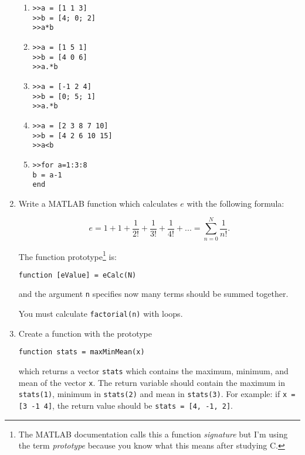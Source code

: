 \documentclass{lab}
\begin{document}
\begin{enumerate}
\begin{enumerate}
\item \texttt{>>a = [1 1 3]}\\
\texttt{>>b = [4; 0; 2]}\\
\texttt{>>a*b}

\item \texttt{>>a = [1 5 1]}\\
\texttt{>>b = [4 0 6]}\\
\texttt{>>a.*b}

\item \texttt{>>a = [-1 2 4]}\\
\texttt{>>b = [0; 5; 1]}\\
\texttt{>>a.*b}

\item \texttt{>>a = [2 3 8 7 10]} \\
\texttt{>>b = [4 2 6 10 15]} \\
\texttt{>>a<b}

\item \texttt{>>for a=1:3:8\\
b = a-1\\
end}
	\end{enumerate}

\item Write a MATLAB function which calculates $e$ with the following formula:

\begin{equation}
e = 1 + 1 + \frac{1}{2!} + \frac{1}{3!} + \frac{1}{4!} + ... = \sum_{n=0}^N \frac{1}{n!}.
\end{equation}

The function prototype\footnote{The MATLAB documentation calls this a function \textit{signature} but I'm using the term \textit{prototype} because you know what this means after studying C.} is:

\begin{lstlisting}[style=pseudo]
function [eValue] = eCalc(N)
\end{lstlisting}

and the argument \texttt{n} specifies now many terms should be summed together.

You must calculate \texttt{factorial(n)} with loops.

\item Create a function with the prototype

\texttt{function stats = maxMinMean(x)}

which returns a vector \texttt{stats} which contains the maximum, minimum, and mean of the vector \texttt{x}. The return variable should contain the maximum in \texttt{stats(1)}, minimum in \texttt{stats(2)} and mean in \texttt{stats(3)}.
For example:
if \texttt{x = [3 -1 4]}, the return value should be \texttt{stats = [4, -1, 2]}.


\end{enumerate}
\end{document}

